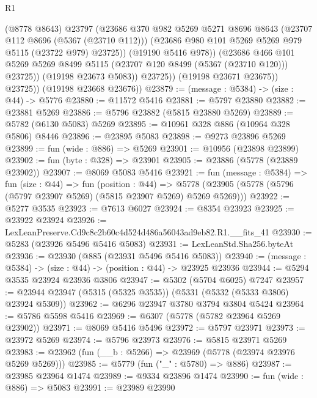\begin{lexlean}{R1}
\begin{coremodule}
                      (@8778 @8643)
                      @23797
                      (@23686
                        @370
                        @982
                        @5269
                        @5271
                        @8696
                        @8643
                        (@23707 @112 @8696 (@5367 (@23710 @112)))
                        (@23686 @980 @101 @5269 @5269 @979 @5115 (@23722 @979) @23725))
                      (@19190 @5416 @978))
                    (@23686
                      @466
                      @101
                      @5269
                      @5269
                      @8499
                      @5115
                      (@23707 @120 @8499 (@5367 (@23710 @120)))
                      @23725))
                  (@19198 @23673 @5083))
                @23725))
            (@19198 @23671 @23675))
          @23725))
      (@19198 @23668 @23676))
@23879 := (message : @5384) -> (size : @44) -> @5776
@23880 := @11572 @5416
@23881 := @5797 @23880
@23882 := @23881 @5269
@23886 := @5796 @23882 (@5815 @23880 @5269)
@23889 := @5782 (@6130 @5083) @5269
@23895 := @10961 @328 @886 (@10964 @328 @5806) @8446
@23896 := @23895 @5083
@23898 := @9273 @23896 @5269
@23899 := fun (wide : @886) => @5269
@23901 := @10956 (@23898 @23899)
@23902 := fun (byte : @328) => @23901
@23905 := @23886 (@5778 (@23889 @23902))
@23907 := @8069 @5083 @5416
@23921 := fun (message : @5384) =>
  fun (size : @44) =>
  fun (position : @44) =>
  @5778 (@23905 (@5778 (@5796 (@5797 @23907 @5269) (@5815 @23907 @5269) @5269 @5269)))
@23922 := @5277 @3535
@23923 := @7613 @6027
@23924 := @8354 @23923
@23925 := @23922 @23924
@23926 := LexLeanPreserve.Cd9c8c2b60c4d524d486a56043ad9eb82.R1.__fits_41
@23930 := @5283 (@23926 @5496 @5416 @5083)
@23931 := LexLeanStd.Sha256.byteAt
@23936 := @23930 (@885 (@23931 @5496 @5416 @5083))
@23940 := (message : @5384) -> (size : @44) -> (position : @44) -> @23925 @23936
@23944 := @5294 @3535 @23924 @23936 @3806
@23947 := @5302 (@5704 @6025) @7247
@23957 := @23944 @23947 (@5315 (@5325 @3535)) (@5331 (@5332 (@5333 @3806) @23924 @5309))
@23962 := @6296 @23947 @3780 @3794 @3804 @5424
@23964 := @5786 @5598 @5416
@23969 := @6307 (@5778 (@5782 @23964 @5269 @23902))
@23971 := @8069 @5416 @5496
@23972 := @5797 @23971
@23973 := @23972 @5269
@23974 := @5796 @23973
@23976 := @5815 @23971 @5269
@23983 := @23962 (fun (__b : @5266) => @23969 (@5778 (@23974 @23976 @5269 @5269)))
@23985 := @5779 (fun ("_" : @5780) => @886)
@23987 := @23985 @23964 @1474
@23989 := @9334 @23896 @1474
@23990 := fun (wide : @886) => @5083
@23991 := @23989 @23990

\end{coremodule}
\end{lexlean}
